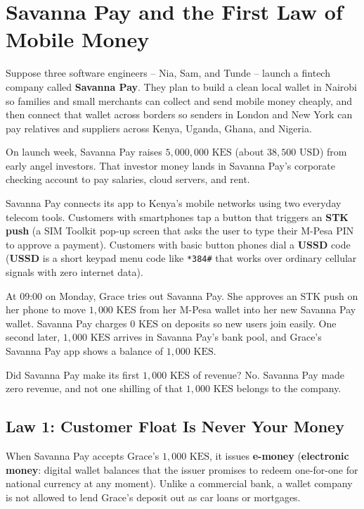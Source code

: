 \section{Savanna Pay and the First Law of Mobile Money}

Suppose three software engineers -- Nia, Sam, and Tunde -- launch a fintech company called \textbf{Savanna Pay}. They plan to build a clean local wallet in Nairobi so families and small merchants can collect and send mobile money cheaply, and then connect that wallet across borders so senders in London and New York can pay relatives and suppliers across Kenya, Uganda, Ghana, and Nigeria.

On launch week, Savanna Pay raises $5{,}000{,}000\text{ KES}$ (about $38{,}500\text{ USD}$) from early angel investors. That investor money lands in Savanna Pay's corporate checking account to pay salaries, cloud servers, and rent.

Savanna Pay connects its app to Kenya's mobile networks using two everyday telecom tools. Customers with smartphones tap a button that triggers an \textbf{STK push} (a SIM Toolkit pop-up screen that asks the user to type their M-Pesa PIN to approve a payment). Customers with basic button phones dial a \textbf{USSD} code (\textbf{USSD} is a short keypad menu code like \texttt{*384\#} that works over ordinary cellular signals with zero internet data).

At 09:00 on Monday, Grace tries out Savanna Pay. She approves an STK push on her phone to move $1{,}000\text{ KES}$ from her M-Pesa wallet into her new Savanna Pay wallet. Savanna Pay charges $0\text{ KES}$ on deposits so new users join easily. One second later, $1{,}000\text{ KES}$ arrives in Savanna Pay's bank pool, and Grace's Savanna Pay app shows a balance of $1{,}000\text{ KES}$.

Did Savanna Pay make its first $1{,}000\text{ KES}$ of revenue? No. Savanna Pay made zero revenue, and not one shilling of that $1{,}000\text{ KES}$ belongs to the company.

\subsection{Law 1: Customer Float Is Never Your Money}

When Savanna Pay accepts Grace's $1{,}000\text{ KES}$, it issues \textbf{e-money} (\textbf{electronic money}: digital wallet balances that the issuer promises to redeem one-for-one for national currency at any moment). Unlike a commercial bank, a wallet company is not allowed to lend Grace's deposit out as car loans or mortgages.

